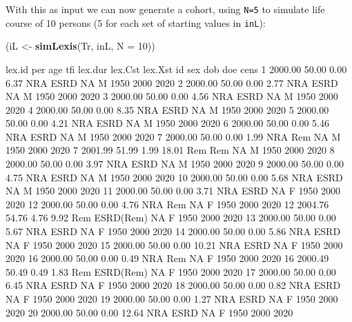 \documentclass[
]{book}
\newenvironment{Shaded}{\begin{snugshade}}{\end{snugshade}}
\newcommand{\AttributeTok}[1]{\textcolor[rgb]{0.13,0.29,0.53}{#1}}
\newcommand{\DecValTok}[1]{\textcolor[rgb]{0.00,0.00,0.81}{#1}}
\newcommand{\FunctionTok}[1]{\textcolor[rgb]{0.13,0.29,0.53}{\textbf{#1}}}
\newcommand{\NormalTok}[1]{#1}
\newcommand{\OtherTok}[1]{\textcolor[rgb]{0.56,0.35,0.01}{#1}}
\begin{document}
\begin{enumerate}
  With this as input we can now generate a cohort, using \texttt{N=5}
  to simulate life course of 10 persons (5 for each set of starting values
  in \texttt{inL}):

\begin{Shaded}
\begin{Highlighting}[]
\NormalTok{(iL }\OtherTok{\textless{}{-}} \FunctionTok{simLexis}\NormalTok{(Tr, inL, }\AttributeTok{N =} \DecValTok{10}\NormalTok{))}
\end{Highlighting}
\end{Shaded}

\begin{Shaded}
\begin{Highlighting}[]
\NormalTok{ lex.id     per   age  tfi lex.dur lex.Cst   lex.Xst id sex  dob  doe cens}
\NormalTok{      1 2000.00 50.00 0.00    6.37     NRA      ESRD NA   M 1950 2000 2020}
\NormalTok{      2 2000.00 50.00 0.00    2.77     NRA      ESRD NA   M 1950 2000 2020}
\NormalTok{      3 2000.00 50.00 0.00    4.56     NRA      ESRD NA   M 1950 2000 2020}
\NormalTok{      4 2000.00 50.00 0.00    8.35     NRA      ESRD NA   M 1950 2000 2020}
\NormalTok{      5 2000.00 50.00 0.00    4.21     NRA      ESRD NA   M 1950 2000 2020}
\NormalTok{      6 2000.00 50.00 0.00    5.46     NRA      ESRD NA   M 1950 2000 2020}
\NormalTok{      7 2000.00 50.00 0.00    1.99     NRA       Rem NA   M 1950 2000 2020}
\NormalTok{      7 2001.99 51.99 1.99   18.01     Rem       Rem NA   M 1950 2000 2020}
\NormalTok{      8 2000.00 50.00 0.00    3.97     NRA      ESRD NA   M 1950 2000 2020}
\NormalTok{      9 2000.00 50.00 0.00    4.75     NRA      ESRD NA   M 1950 2000 2020}
\NormalTok{     10 2000.00 50.00 0.00    5.68     NRA      ESRD NA   M 1950 2000 2020}
\NormalTok{     11 2000.00 50.00 0.00    3.71     NRA      ESRD NA   F 1950 2000 2020}
\NormalTok{     12 2000.00 50.00 0.00    4.76     NRA       Rem NA   F 1950 2000 2020}
\NormalTok{     12 2004.76 54.76 4.76    9.92     Rem ESRD(Rem) NA   F 1950 2000 2020}
\NormalTok{     13 2000.00 50.00 0.00    5.67     NRA      ESRD NA   F 1950 2000 2020}
\NormalTok{     14 2000.00 50.00 0.00    5.86     NRA      ESRD NA   F 1950 2000 2020}
\NormalTok{     15 2000.00 50.00 0.00   10.21     NRA      ESRD NA   F 1950 2000 2020}
\NormalTok{     16 2000.00 50.00 0.00    0.49     NRA       Rem NA   F 1950 2000 2020}
\NormalTok{     16 2000.49 50.49 0.49    1.83     Rem ESRD(Rem) NA   F 1950 2000 2020}
\NormalTok{     17 2000.00 50.00 0.00    6.45     NRA      ESRD NA   F 1950 2000 2020}
\NormalTok{     18 2000.00 50.00 0.00    0.82     NRA      ESRD NA   F 1950 2000 2020}
\NormalTok{     19 2000.00 50.00 0.00    1.27     NRA      ESRD NA   F 1950 2000 2020}
\NormalTok{     20 2000.00 50.00 0.00   12.64     NRA      ESRD NA   F 1950 2000 2020}
\end{Highlighting}
\end{Shaded}


\end{enumerate}
\end{document}
